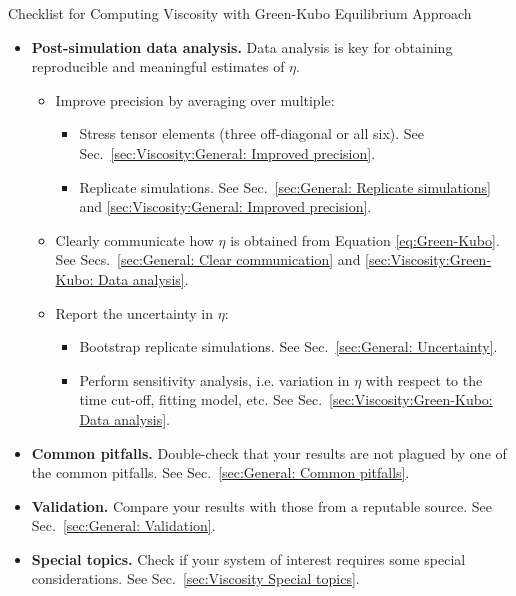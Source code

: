 \documentclass[9pt,bestpractices]{livecoms}
\begin{document}
\begin{Checklists*}[p!]
\begin{checklist}{Checklist for Computing Viscosity with Green-Kubo Equilibrium Approach}
\begin{itemize}
			\item
			\textbf{Post-simulation data analysis.} Data analysis is key for obtaining reproducible and meaningful estimates of $\eta$.
			\begin{itemize}
				\item Improve precision by averaging over multiple:
				\begin{itemize}
					\item Stress tensor elements (three off-diagonal or all six). See Sec.\ \ref{sec:Viscosity:General: Improved precision}.
					\item Replicate simulations. See Sec.\ \ref{sec:General: Replicate simulations} and \ref{sec:Viscosity:General: Improved precision}.
				\end{itemize}
				\item Clearly communicate how $\eta$ is obtained from Equation \ref{eq:Green-Kubo}. See Secs.\ \ref{sec:General: Clear communication} and \ref{sec:Viscosity:Green-Kubo: Data analysis}.
				\item Report the uncertainty in $\eta$:
				\begin{itemize}
					\item Bootstrap replicate simulations. See Sec.\ \ref{sec:General: Uncertainty}.
					\item Perform sensitivity analysis, i.e. variation in $\eta$ with respect to the time cut-off, fitting model, etc. See Sec.\ \ref{sec:Viscosity:Green-Kubo: Data analysis}.
				\end{itemize}
			\end{itemize}
			\vspace{-0.325\baselineskip} %

			\item
			\textbf{Common pitfalls.} Double-check that your results are not plagued by one of the common pitfalls. See Sec.\ \ref{sec:General: Common pitfalls}.

			\item
			\textbf{Validation.} Compare your results with those from a reputable source. See Sec.\ \ref{sec:General: Validation}.

			\item
			\textbf{Special topics.} Check if your system of interest requires some special considerations. See Sec.\ \ref{sec:Viscosity Special topics}.

		\end{itemize}
	\end{checklist}
\end{Checklists*}
\end{document}
